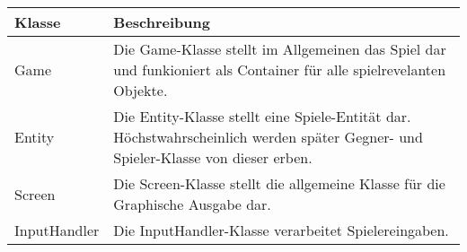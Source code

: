 \begin{tabularx}{\textwidth}{| p{0.9cm} | X |}
\hline
\rowcolor[gray]{0.9} Klasse & Beschreibung \\
\hline
Game & Die Game-Klasse stellt im Allgemeinen das Spiel dar und funkioniert als Container für alle spielrevelanten Objekte. \\
\hline
Entity & Die Entity-Klasse stellt eine Spiele-Entität dar. Höchstwahrscheinlich werden später Gegner- und Spieler-Klasse von dieser erben. \\
\hline
Screen & Die Screen-Klasse stellt die allgemeine Klasse für die Graphische Ausgabe dar. \\
\hline
InputHandler & Die InputHandler-Klasse verarbeitet Spielereingaben. \\
\hline
\end{tabularx}